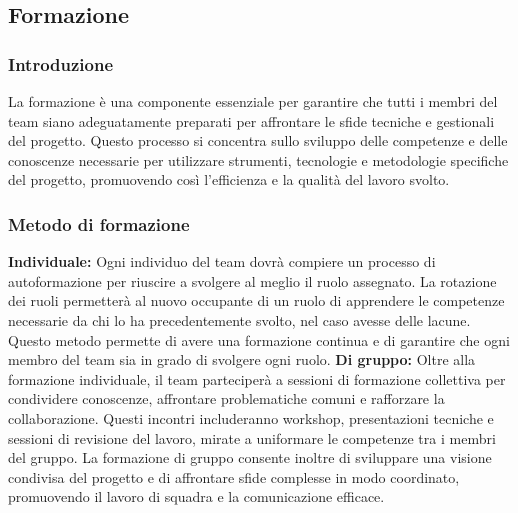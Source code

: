 \subsection{Formazione}
\subsubsection{Introduzione}
La formazione è una componente essenziale per garantire che tutti i membri del team siano adeguatamente preparati per affrontare le sfide tecniche e gestionali del progetto. Questo processo si concentra sullo sviluppo delle competenze e delle conoscenze necessarie per utilizzare strumenti, tecnologie e metodologie specifiche del progetto, promuovendo così l’efficienza e la qualità del lavoro svolto.

\subsubsection{Metodo di formazione}

\textbf{Individuale:}
Ogni individuo del team dovrà compiere un processo di autoformazione per riuscire a svolgere al meglio il ruolo assegnato. La rotazione dei ruoli permetterà al nuovo occupante di un ruolo di apprendere le competenze necessarie da chi lo ha precedentemente svolto, nel caso avesse delle lacune. Questo metodo permette di avere una formazione continua e di garantire che ogni membro del team sia in grado di svolgere ogni ruolo.
\textbf{Di gruppo:}
Oltre alla formazione individuale, il team parteciperà a sessioni di formazione collettiva per condividere conoscenze, affrontare problematiche comuni e rafforzare la collaborazione. Questi incontri includeranno workshop, presentazioni tecniche e sessioni di revisione del lavoro, mirate a uniformare le competenze tra i membri del gruppo. La formazione di gruppo consente inoltre di sviluppare una visione condivisa del progetto e di affrontare sfide complesse in modo coordinato, promuovendo il lavoro di squadra e la comunicazione efficace.

